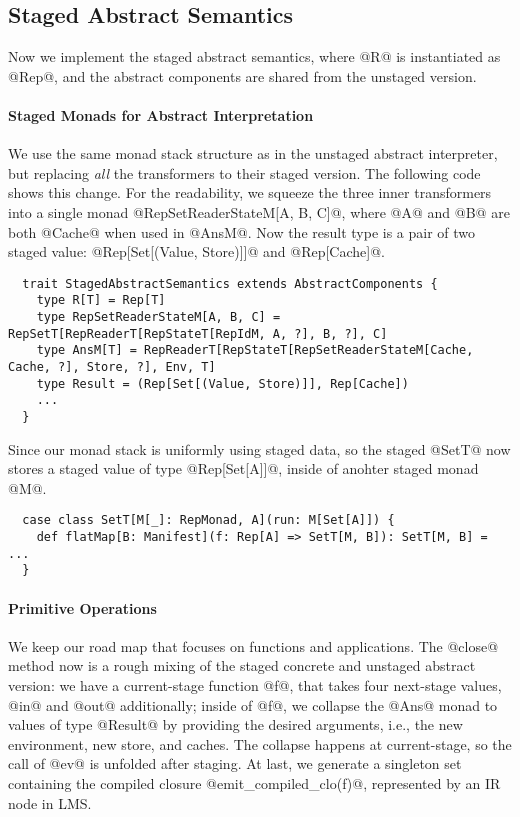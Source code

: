 \subsection{Staged Abstract Semantics}

Now we implement the staged abstract semantics, where @R@ is instantiated as
@Rep@, and the abstract components are shared from the unstaged version.

\paragraph{Staged Monads for Abstract Interpretation}
We use the same monad stack structure as in the unstaged abstract interpreter,
but replacing \textit{all} the transformers to their staged version. The
following code shows this change. For the readability, we squeeze the three
inner transformers into a single monad @RepSetReaderStateM[A, B, C]@, where @A@
and @B@ are both @Cache@ when used in @AnsM@. Now the result type is a pair of
two staged value: @Rep[Set[(Value, Store)]]@ and @Rep[Cache]@.

\begin{lstlisting}
  trait StagedAbstractSemantics extends AbstractComponents {
    type R[T] = Rep[T]
    type RepSetReaderStateM[A, B, C] = RepSetT[RepReaderT[RepStateT[RepIdM, A, ?], B, ?], C]
    type AnsM[T] = RepReaderT[RepStateT[RepSetReaderStateM[Cache, Cache, ?], Store, ?], Env, T]
    type Result = (Rep[Set[(Value, Store)]], Rep[Cache])
    ...
  }
\end{lstlisting}

Since our monad stack is uniformly using staged data, so the staged @SetT@ now
stores a staged value of type @Rep[Set[A]]@, inside of anohter staged monad @M@.

\begin{lstlisting}
  case class SetT[M[_]: RepMonad, A](run: M[Set[A]]) {
    def flatMap[B: Manifest](f: Rep[A] => SetT[M, B]): SetT[M, B] = ...
  }
\end{lstlisting}

\paragraph{Primitive Operations} We keep our road map that focuses on functions
and applications. The @close@ method now is a rough mixing of the staged
concrete and unstaged abstract version: we have a current-stage function @f@,
that takes four next-stage values, @in@ and @out@ additionally; inside of @f@,
we collapse the @Ans@ monad to values of type @Result@ by providing the desired
arguments, i.e., the new environment, new store, and caches. The collapse
happens at current-stage, so the call of @ev@ is unfolded after staging. At
last, we generate a singleton set containing the compiled closure
@emit_compiled_clo(f)@, represented by an IR node in LMS.

